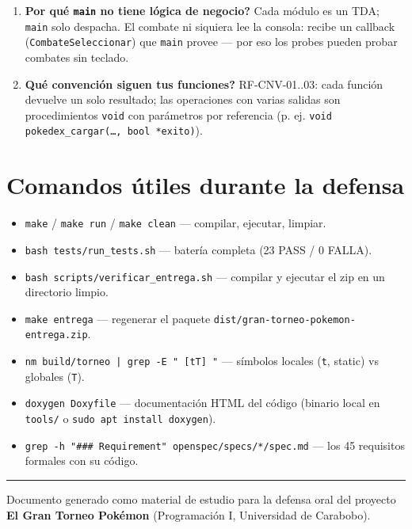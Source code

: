 \documentclass[11pt,a4paper]{article}
\begin{document}
\begin{enumerate}[leftmargin=1.6em]
  Ocho chequeos (existen, pertenecen al combate, ronda correcta, clasificados,
  eliminados, ganador v\'alido, sin empates en eliminatoria, coherencia entre
  rondas) y los participantes siempre los resuelve el sistema.
\item \textbf{\textquestiondown Por qu\'e \texttt{main} no tiene l\'ogica de negocio?}
  Cada m\'odulo es un TDA; \texttt{main} solo despacha. El combate ni siquiera
  lee la consola: recibe un callback (\texttt{CombateSeleccionar}) que
  \texttt{main} provee — por eso los probes pueden probar combates sin teclado.
\item \textbf{\textquestiondown Qu\'e convenci\'on siguen tus funciones?}
  RF-CNV-01..03: cada funci\'on devuelve un solo resultado; las operaciones con
  varias salidas son procedimientos \texttt{void} con par\'ametros por
  referencia (p. ej. \texttt{void pokedex\_cargar(\dots, bool *exito)}).
\end{enumerate}

\section{Comandos \'utiles durante la defensa}
\begin{itemize}[leftmargin=1.6em]
\item \texttt{make} / \texttt{make run} / \texttt{make clean} — compilar, ejecutar, limpiar.
\item \texttt{bash tests/run\_tests.sh} — bater\'ia completa (23 PASS / 0 FALLA).
\item \texttt{bash scripts/verificar\_entrega.sh} — compilar y ejecutar el zip en un directorio limpio.
\item \texttt{make entrega} — regenerar el paquete \texttt{dist/gran-torneo-pokemon-entrega.zip}.
\item \texttt{nm build/torneo | grep -E " [tT] "} — s\'imbolos locales (\texttt{t}, static) vs globales (\texttt{T}).
\item \texttt{doxygen Doxyfile} — documentaci\'on HTML del c\'odigo (binario local en \texttt{tools/} o \texttt{sudo apt install doxygen}).
\item \texttt{grep -h "\#\#\# Requirement" openspec/specs/*/spec.md} — los 45 requisitos formales con su c\'odigo.
\end{itemize}

\vspace{6mm}
\noindent\rule{\textwidth}{0.4pt}
\begin{center}\small
Documento generado como material de estudio para la defensa oral del proyecto
\textbf{El Gran Torneo Pok\'emon} (Programaci\'on I, Universidad de Carabobo).
\end{center}
\end{document}
